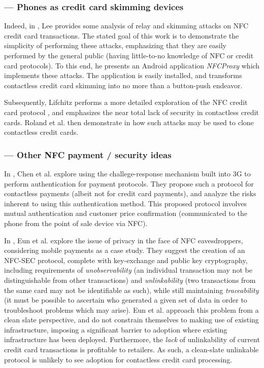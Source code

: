 \subsubsection*{--- Phones as credit card skimming devices}

Indeed, in \cite{lee2012nfc}, Lee provides some analysis of relay and skimming attacks on NFC credit card transactions.
The stated goal of this work is to demonstrate the simplicity of performing these attacks,
    emphasizing that they are easily performed by the general public (having little-to-no knowledge of NFC or credit card protocols).
To this end, he presents an Android application \emph{NFCProxy} \cite{NFCProxy} which implements these attacks.
The application is easily installed, and transforms contactless credit card skimming into no more than a button-push endeavor.

Subsequently, Lifchitz performs a more detailed exploration of the NFC credit card protocol \cite{lifchitz2012hacking},
    and emphasizes the near total lack of security in contactless credit cards.
Roland et al. then demonstrate in \cite{roland2013cloning} how such attacks may be used to clone contactless credit cards.


\subsubsection*{--- Other NFC payment / security ideas}

In \cite{chen2010using}, Chen et al. explore using the challege-response mechanism built into 3G to perform authentication for payment protocols.
They propose such a protocol for contactless payments (albeit not for credit card payments), and analyze the risks inherent to using this authentication method.
This proposed protocol involves mutual authentication and customer price confirmation (communicated to the phone from the point of sale device via NFC).

In \cite{eun2013conditional}, Eun et al. explore the issue of privacy in the face of NFC eavesdroppers, considering mobile payments as a case study.
They suggest the creation of an NFC-SEC protocol, complete with key-exchange and public key cryptography, including requirements of
    \emph{unobservability} (an individual transaction may not be distinguishable from other transactions) and
    \emph{unlinkability} (two transactions from the same card may not be identifiable as such), while still maintaining
    \emph{traceability} (it must be possible to ascertain who generated a given set of data in order to troubleshoot problems which may arise).
Eun et al. approach this problem from a clean slate perspective, and do not constrain themselves to making use of existing infrastructure,
    imposing a significant barrier to adoption where existing infrastructure has been deployed.
Furthermore, the \emph{lack} of unlinkability of current credit card transactions is profitable to retailers.
As such, a clean-slate unlinkable protocol is unlikely to see adoption for contactless credit card processing.

